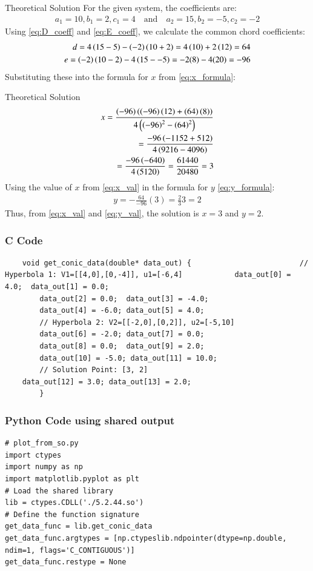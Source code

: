 \documentclass{beamer}
\begin{document}
		\begin{frame}{Theoretical Solution}
			For the given system, the coefficients are:
		\begin{align}
			a_1 = 10, b_1 = 2, c_1 = 4 \quad \text{and} \quad a_2 = 15, b_2 = -5, c_2 = -2
		\end{align}
		Using \eqref{eq:D_coeff} and \eqref{eq:E_coeff}, we calculate the common chord coefficients:
		\begin{align}
			d = 4\left(15-5\right) - \left(-2\right)\left(10+2\right) = 4\left(10\right) + 2\left(12\right) = 64 \\
			e = \left(-2\right)\left(10-2\right) - 4\left(15--5\right) = -2(8) - 4(20) = -96
		\end{align}
		Substituting these into the formula for $x$ from \eqref{eq:x_formula}:
		
	\end{frame}	
	\begin{frame}{Theoretical Solution}
	\begin{align}
		x = \frac{\left(-96\right) \left(\left(-96\right)\left(12\right) + \left(64\right)\left(8\right)\right)}{4\left(\left(-96\right)^2-\left(64\right)^2\right)} \\
		= \frac{-96  \left(-1152 + 512\right)}{4\left(9216 - 4096\right)} \\
		= \frac{-96\left(-640\right)}{4\left(5120\right)} = \frac{61440}{20480} = 3 \label{eq:x_val}
	\end{align}
	Using the value of $x$ from \eqref{eq:x_val} in the formula for $y$ \eqref{eq:y_formula}:
	\begin{align}
		y = -\frac{64}{-96}(3) = \frac{2}{3}3 = 2 \label{eq:y_val}
	\end{align}
	Thus, from \eqref{eq:x_val} and \eqref{eq:y_val}, the solution is $x=3$ and $y=2$.
	
	\end{frame}
	
	\begin{frame}[fragile]
		\frametitle{C Code}
		
		\begin{lstlisting}
	void get_conic_data(double* data_out) {							// Hyperbola 1: V1=[[4,0],[0,-4]], u1=[-6,4]			data_out[0] = 4.0;  data_out[1] = 0.0;
		data_out[2] = 0.0;  data_out[3] = -4.0;
		data_out[4] = -6.0; data_out[5] = 4.0;
		// Hyperbola 2: V2=[[-2,0],[0,2]], u2=[-5,10]
		data_out[6] = -2.0; data_out[7] = 0.0;
		data_out[8] = 0.0;  data_out[9] = 2.0;
		data_out[10] = -5.0; data_out[11] = 10.0;
		// Solution Point: [3, 2]
	data_out[12] = 3.0; data_out[13] = 2.0;
		}
		\end{lstlisting}
	\end{frame}
	\begin{frame}[fragile]
		\frametitle{Python Code using shared output}
		
		\begin{lstlisting}
# plot_from_so.py
import ctypes
import numpy as np
import matplotlib.pyplot as plt
# Load the shared library
lib = ctypes.CDLL('./5.2.44.so')
# Define the function signature
get_data_func = lib.get_conic_data
get_data_func.argtypes = [np.ctypeslib.ndpointer(dtype=np.double, ndim=1, flags='C_CONTIGUOUS')]
get_data_func.restype = None		
		\end{lstlisting}
	\end{frame}
\end{document}
